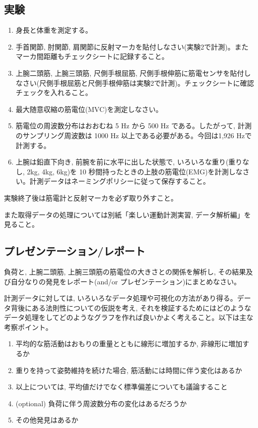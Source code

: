 \documentclass{ltjsarticle}
\begin{document}
\subsection{実験}

\begin{enumerate}
  \item 身長と体重を測定する。
  \item 手首関節, 肘関節, 肩関節に反射マーカを貼付しなさい(実験2で計測)。またマーカ間距離もチェックシートに記録すること。
  \item 上腕二頭筋, 上腕三頭筋, 尺側手根屈筋, 尺側手根伸筋に筋電センサを貼付しなさい(尺側手根屈筋と尺側手根伸筋は実験2で計測)。チェックシートに確認チェックを入れること。
  \item 最大随意収縮の筋電位(MVC)を測定しなさい。
  \item 筋電位の周波数分布はおおむね 5 Hz から 500 Hz である。したがって, 計測のサンプリング周波数は 1000 Hz 以上である必要がある。今回は1,926 Hzで計測する。
  \item 上腕は鉛直下向き, 前腕を前に水平に出した状態で, いろいろな重り(重りなし, 2kg, 4kg, 6kg)を 10 秒間持ったときの上肢の筋電位(EMG)を計測しなさい。計測データはネーミングポリシーに従って保存すること。
\end{enumerate}  

実験終了後は筋電計と反射マーカを必ず取り外すこと。

また取得データの処理については別紙「楽しい運動計測実習, データ解析編」を見ること。

\subsection{プレゼンテーション/レポート}

負荷と, 上腕二頭筋, 上腕三頭筋の筋電位の大きさとの関係を解析し, その結果及び自分なりの発見をレポート(and/or プレゼンテーション)にまとめなさい。

計測データに対しては, いろいろなデータ処理や可視化の方法があり得る。データ背後にある法則性についての仮説を考え, それを検証するためにはどのようなデータ処理をしてどのようなグラフを作れば良いかよく考えること。以下は主な考察ポイント。

\begin{enumerate}
  \item 平均的な筋活動はおもりの重量とともに線形に増加するか, 非線形に増加するか
  \item 重りを持って姿勢維持を続けた場合, 筋活動には時間に伴う変化はあるか
  \item 以上については, 平均値だけでなく標準偏差についても議論すること
  \item (optional) 負荷に伴う周波数分布の変化はあるだろうか
  \item その他発見はあるか
\end{enumerate}
\end{document}
